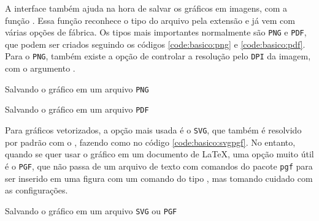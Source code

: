 A interface \pyplot também ajuda na hora de salvar os gráficos em imagens, com a função . Essa função reconhece o tipo do arquivo pela extensão e já vem com várias opções de fábrica. Os tipos mais importantes normalmente são \texttt{PNG} e \texttt{PDF}, que podem ser criados seguindo os códigos \ref{code:basico:png} e  \ref{code:basico:pdf}. Para o \texttt{PNG}, também existe a opção de controlar a resolução pelo \texttt{DPI} da imagem, com o argumento .

\begin{listing}[H]
    \caption{Salvando o gráfico em um arquivo \texttt{PNG}}
    \label{code:basico:png}

\end{listing}

\begin{listing}[H]
    \caption{Salvando o gráfico em um arquivo \texttt{PDF}}
    \label{code:basico:pdf}

\end{listing}

Para gráficos vetorizados, a opção mais usada é o \texttt{SVG}, que também é resolvido por padrão com o \matplotlib, fazendo como no código \ref{code:basico:svgpgf}. No entanto, quando se quer usar o gráfico em um documento de \LaTeX, uma opção muito útil é o \texttt{PGF}, que não passa de um arquivo de texto com comandos do pacote \texttt{pgf} para ser inserido em uma figura com um comando do tipo \texttt{}, mas tomando cuidado com as configurações.

\begin{listing}[H]
    \caption{Salvando o gráfico em um arquivo \texttt{SVG} ou \texttt{PGF}}
    \label{code:basico:svgpgf}

\end{listing}
